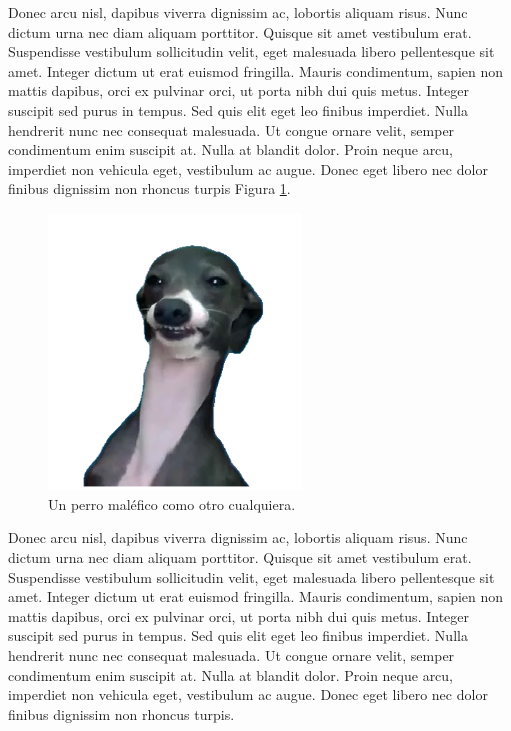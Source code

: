 Donec arcu nisl, dapibus viverra dignissim ac, lobortis aliquam risus. Nunc dictum urna nec diam aliquam porttitor. Quisque sit amet vestibulum erat. Suspendisse vestibulum sollicitudin velit, eget malesuada libero pellentesque sit amet. Integer dictum ut erat euismod fringilla. Mauris condimentum, sapien non mattis dapibus, orci ex pulvinar orci, ut porta nibh dui quis metus. Integer suscipit sed purus in tempus. Sed quis elit eget leo finibus imperdiet. Nulla hendrerit nunc nec consequat malesuada. Ut congue ornare velit, semper condimentum enim suscipit at. Nulla at blandit dolor. Proin neque arcu, imperdiet non vehicula eget, vestibulum ac augue. Donec eget libero nec dolor finibus dignissim non rhoncus turpis Figura \ref{fig:evil-dog}.

\begin{figure}[!ht]
	\begin{centering}
		\includegraphics[width=0.6\textwidth]{images/evil-dog.png}
			\caption{Un perro maléfico como otro cualquiera.}
				\label{fig:evil-dog}
	\end{centering}
\end{figure}

Donec arcu nisl, dapibus viverra dignissim ac, lobortis aliquam risus. Nunc dictum urna nec diam aliquam porttitor. Quisque sit amet vestibulum erat. Suspendisse vestibulum sollicitudin velit, eget malesuada libero pellentesque sit amet. Integer dictum ut erat euismod fringilla. Mauris condimentum, sapien non mattis dapibus, orci ex pulvinar orci, ut porta nibh dui quis metus. Integer suscipit sed purus in tempus. Sed quis elit eget leo finibus imperdiet. Nulla hendrerit nunc nec consequat malesuada. Ut congue ornare velit, semper condimentum enim suscipit at. Nulla at blandit dolor. Proin neque arcu, imperdiet non vehicula eget, vestibulum ac augue. Donec eget libero nec dolor finibus dignissim non rhoncus turpis.

